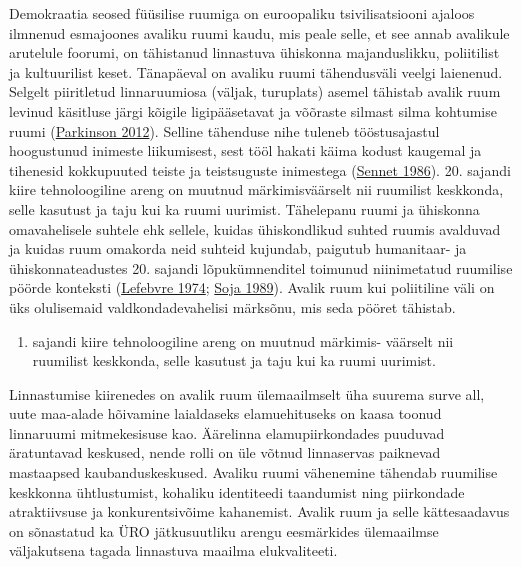 \documentclass[estonian,]{article}
\providecommand{\tightlist}{%
  \setlength{\itemsep}{0pt}\setlength{\parskip}{0pt}}
\begin{document}
Demokraatia seosed füüsilise ruumiga on euroopaliku tsivilisatsiooni ajaloos ilmnenud esmajoones avaliku ruumi kaudu, mis peale selle, et see annab avalikule arutelule foorumi, on tähistanud linnastuva ühiskonna majanduslikku, poliitilist ja kultuurilist keset. Tänapäeval on avaliku ruumi tähendusväli veelgi laienenud. Selgelt piiritletud linnaruumiosa (väljak, turuplats) asemel tähistab avalik ruum levinud käsitluse järgi kõigile ligipääsetavat ja võõraste silmast silma kohtumise ruumi (\protect\hyperlink{Parkinson2012}{Parkinson 2012}). Selline tähenduse nihe tuleneb tööstusajastul hoogustunud inimeste liikumisest, sest tööl hakati käima kodust kaugemal ja tihenesid kokkupuuted teiste ja teistsuguste inimestega (\protect\hyperlink{Sennet1986}{Sennet 1986}). 20. sajandi kiire tehnoloogiline areng on muutnud märkimisväärselt nii ruumilist keskkonda, selle kasutust ja taju kui ka ruumi uurimist. Tähelepanu ruumi ja ühiskonna omavahelisele suhtele ehk sellele, kuidas ühiskondlikud suhted ruumis avalduvad ja kuidas ruum omakorda neid suhteid kujundab, paigutub humanitaar- ja ühiskonnateadustes 20. sajandi lõpukümnenditel toimunud niinimetatud ruumilise pöörde konteksti (\protect\hyperlink{Lefebvre1974}{Lefebvre 1974}; \protect\hyperlink{Soja1989}{Soja 1989}). Avalik ruum kui poliitiline väli on üks olulisemaid valdkondadevahelisi märksõnu, mis seda pööret tähistab.

\begin{blockquote-left}
\begin{enumerate}
\def\labelenumi{\arabic{enumi}.}
\setcounter{enumi}{19}
\tightlist
\item
  sajandi kiire tehnoloogiline areng on muutnud märkimis- väärselt nii
  ruumilist keskkonda, selle kasutust ja taju kui ka ruumi uurimist.
\end{enumerate}
\end{blockquote-left}

Linnastumise kiirenedes on avalik ruum ülemaailmselt üha suurema surve all, uute maa-alade hõivamine laialdaseks elamuehituseks on kaasa toonud linnaruumi mitmekesisuse kao. Äärelinna elamupiirkondades puuduvad äratuntavad keskused, nende rolli on üle võtnud linnaservas paiknevad mastaapsed kaubanduskeskused. Avaliku ruumi vähenemine tähendab ruumilise keskkonna ühtlustumist, kohaliku identiteedi taandumist ning piirkondade atraktiivsuse ja konkurentsivõime kahanemist. Avalik ruum ja selle kättesaadavus on sõnastatud ka ÜRO jätkusuutliku arengu eesmärkides ülemaailmse väljakutsena tagada linnastuva maailma elukvaliteeti.
\end{document}
